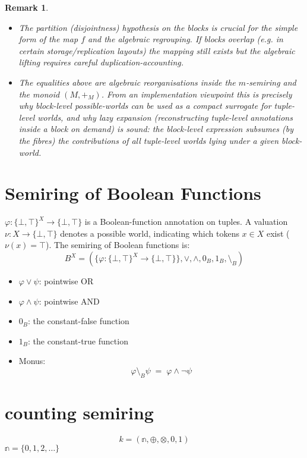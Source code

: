 \documentclass[10pt,a4paper]{scrartcl}
\newtheorem*{remark}{Remark}
\theoremstyle{definition}
\theoremstyle{remark}
\begin{document}
\begin{remark}

\begin{itemize}
  \item The partition (disjointness) hypothesis on the blocks is crucial for the simple form of the map $f$ and the algebraic regrouping. If blocks overlap (e.g. in certain storage/replication layouts) the mapping still exists but the algebraic lifting requires careful duplication-accounting.
  \item The equalities above are algebraic reorganisations inside the $m$-semiring and the monoid $(M,+_M)$. From an implementation viewpoint this is precisely why block-level possible-worlds can be used as a compact surrogate for tuple-level worlds, and why lazy expansion (reconstructing tuple-level annotations inside a block on demand) is sound: the block-level expression subsumes (by the fibres) the contributions of all tuple-level worlds lying under a given block-world.
\end{itemize}
\end{remark}

\section{Semiring of Boolean Functions}

\(\varphi\colon \{\bot,\top\}^X \to \{\bot,\top\}\) is a Boolean-function annotation on tuples.
A valuation \(\nu\colon X \to \{\bot,\top\}\) denotes a possible world,
  indicating which tokens \(x\in X\) exist (\(\nu(x)=\top\)).
The semiring of Boolean functions is:
$$
B^X = (\{\varphi : \{ \bot,\top \}^X \to \{\bot,\top\}\},\vee,\wedge,0_B,1_B,\setminus_B)
$$
\begin{itemize}
    \item \(\varphi \vee \psi\): pointwise OR
    \item \(\varphi \wedge \psi\): pointwise AND
    \item \(0_B\): the constant-false function
    \item \(1_B\): the constant-true function
    \item Monus:
        $$
        \varphi \setminus_B \psi \;=\; \varphi \wedge \neg \psi
        $$
\end{itemize}

\section{counting semiring}
$$k = (\mathbb{n}, \oplus, \otimes, 0, 1)$$
$\mathbb{n} = \{0,1,2,\dots\}$
\end{document}
